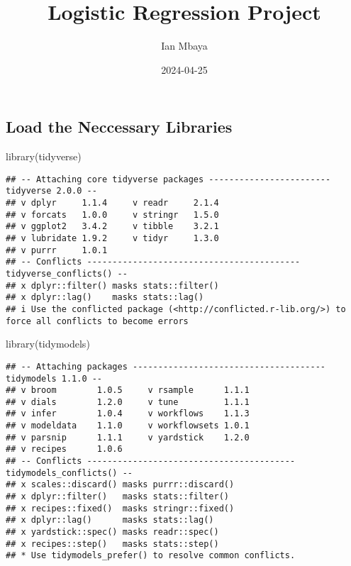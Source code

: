 \documentclass[
]{article}
\title{Logistic Regression Project}
\author{Ian Mbaya}
\date{2024-04-25}
\newenvironment{Shaded}{\begin{snugshade}}{\end{snugshade}}
\newcommand{\FunctionTok}[1]{\textcolor[rgb]{0.00,0.00,0.00}{#1}}
\newcommand{\NormalTok}[1]{#1}
\newcommand{\StringTok}[1]{\textcolor[rgb]{0.31,0.60,0.02}{#1}}
\begin{document}
\maketitle

\hypertarget{load-the-neccessary-libraries}{%
\subsection{Load the Neccessary
Libraries}\label{load-the-neccessary-libraries}}

\begin{Shaded}
\begin{Highlighting}[]
\FunctionTok{library}\NormalTok{(}\StringTok{\textquotesingle{}tidyverse\textquotesingle{}}\NormalTok{)}
\end{Highlighting}
\end{Shaded}

\begin{verbatim}
## -- Attaching core tidyverse packages ------------------------ tidyverse 2.0.0 --
## v dplyr     1.1.4     v readr     2.1.4
## v forcats   1.0.0     v stringr   1.5.0
## v ggplot2   3.4.2     v tibble    3.2.1
## v lubridate 1.9.2     v tidyr     1.3.0
## v purrr     1.0.1     
## -- Conflicts ------------------------------------------ tidyverse_conflicts() --
## x dplyr::filter() masks stats::filter()
## x dplyr::lag()    masks stats::lag()
## i Use the conflicted package (<http://conflicted.r-lib.org/>) to force all conflicts to become errors
\end{verbatim}

\begin{Shaded}
\begin{Highlighting}[]
\FunctionTok{library}\NormalTok{(}\StringTok{\textquotesingle{}tidymodels\textquotesingle{}}\NormalTok{)}
\end{Highlighting}
\end{Shaded}

\begin{verbatim}
## -- Attaching packages -------------------------------------- tidymodels 1.1.0 --
## v broom        1.0.5     v rsample      1.1.1
## v dials        1.2.0     v tune         1.1.1
## v infer        1.0.4     v workflows    1.1.3
## v modeldata    1.1.0     v workflowsets 1.0.1
## v parsnip      1.1.1     v yardstick    1.2.0
## v recipes      1.0.6     
## -- Conflicts ----------------------------------------- tidymodels_conflicts() --
## x scales::discard() masks purrr::discard()
## x dplyr::filter()   masks stats::filter()
## x recipes::fixed()  masks stringr::fixed()
## x dplyr::lag()      masks stats::lag()
## x yardstick::spec() masks readr::spec()
## x recipes::step()   masks stats::step()
## * Use tidymodels_prefer() to resolve common conflicts.
\end{verbatim}
\end{document}
